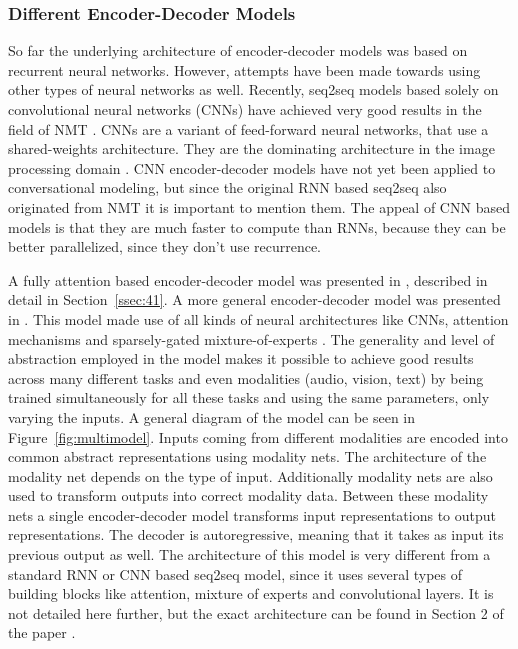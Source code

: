 \documentclass[12pt]{article}
\begin{document}
\subsubsection{Different Encoder-Decoder Models} \label{sssec:diffencdec}
So far the underlying architecture of encoder-decoder models was based on recurrent neural networks. However, attempts have been made towards using other types of neural networks as well. Recently, seq2seq models based solely on convolutional neural networks (CNNs) have achieved very good results in the field of NMT \cite{Kaiser:2016,Kaiser:2017,ByteNet:2016,ConvS2S:2017}. CNNs are a variant of feed-forward neural networks, that use a shared-weights architecture. They are the dominating architecture in the image processing domain \cite{Imagenet:2012}. CNN encoder-decoder models have not yet been applied to conversational modeling, but since the original RNN based seq2seq also originated from NMT it is important to mention them. The appeal of CNN based models is that they are much faster to compute than RNNs, because they can be better parallelized, since they don't use recurrence.

A fully attention based encoder-decoder model was presented in \cite{Vaswani:2017}, described in detail in Section~\ref{ssec:41}. A more general encoder-decoder model was presented in \cite{Kaiser_one_model:2017}. This model made use of all kinds of neural architectures like CNNs, attention mechanisms and sparsely-gated mixture-of-experts \cite{MoE:2017}. The generality and level of abstraction employed in the model makes it possible to achieve good results across many different tasks and even modalities (audio, vision, text) by being trained simultaneously for all these tasks and using the same parameters, only varying the inputs. A general diagram of the model can be seen in Figure~\ref{fig:multimodel}. Inputs coming from different modalities are encoded into common abstract representations using modality nets. The architecture of the modality net depends on the type of input. Additionally modality nets are also used to transform outputs into correct modality data. Between these modality nets a single encoder-decoder model transforms input representations to output representations. The decoder is autoregressive, meaning that it takes as input its previous output as well. The architecture of this model is very different from a standard RNN or CNN based seq2seq model, since it uses several types of building blocks like attention, mixture of experts and convolutional layers. It is not detailed here further, but the exact architecture can be found in Section 2 of the paper \cite{Kaiser_one_model:2017}.
\end{document}
